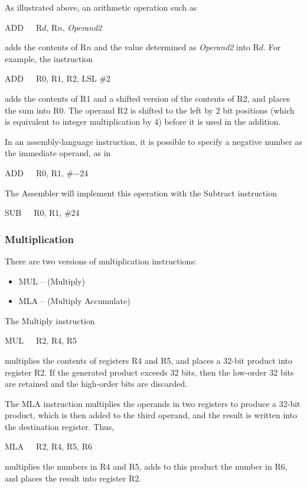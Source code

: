 \documentclass[11pt, twoside, pdftex]{article}
\begin{document}
As illustrated above, an arithmetic operation such as
\begin{center}
		  ADD~~~R$d$, R$n$, {\it Operand2}
\end{center}
\noindent
adds the contents of R$n$ and the value
determined as {\it Operand2} into R$d$. For example, the instruction
\begin{center}
ADD~~~R0, R1, R2, LSL \#2
\end{center}
\noindent
adds the contents of R1 and a shifted version of the contents of
R2, and places the sum into R0. The operand R2 is shifted to the left by 2 bit
positions (which is equivalent to integer multiplication by 4)
before it is used in the addition. 

\noindent
In an assembly-language instruction, it is possible to specify
a negative number as the immediate operand, as in
\begin{center}
ADD~~~R0, R1, \#$-$24
\end{center}
\noindent 
The Assembler will implement this operation with the Subtract instruction
\begin{center}
SUB~~~R0, R1, \#24
\end{center}

\subsubsection {Multiplication}

\noindent
There are two versions of multiplication instructions:

\begin{itemize}
\item MUL -- (Multiply)
\item MLA -- (Multiply Accumulate)
\end{itemize}

The Multiply instruction
\begin{center}
MUL~~~R2, R4, R5
\end{center}
\noindent
multiplies the contents of registers R4 and R5, and places a
32-bit product into register R2. If the generated product exceeds
32 bits, then the low-order 32 bits are retained and the 
high-order bits are discarded.

The MLA instruction multiplies the operands in two registers
to produce a 32-bit product, which is then added to the third 
operand, and the result is written into the destination register. Thus,
\begin{center}
MLA~~~R2, R4, R5, R6
\end{center}
\noindent
multiplies the numbers in R4 and R5, adds to this product the 
number in R6, and places the result into register R2.
\end{document}
